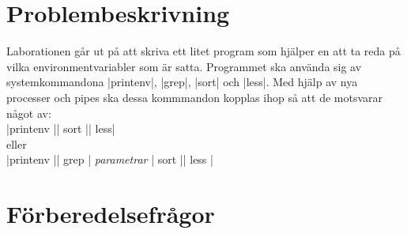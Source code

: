 \documentclass[paper=a4, fontsize=11pt]{scrartcl} %
\numberwithin{equation}{section} %
\numberwithin{figure}{section} %
\numberwithin{table}{section} %
\begin{document}
\section{Problembeskrivning}
Laborationen går ut på att skriva ett litet program som hjälper en att ta reda
på vilka environmentvariabler som är satta.
Programmet ska använda sig av systemkommandona |printenv|, |grep|, |sort|
och |less|.
Med hjälp av nya processer och pipes ska dessa kommmandon kopplas ihop
så att de motsvarar något av:
\\
|printenv |\textbar| sort |\textbar| less| \\ eller \\
|printenv |\textbar| grep | \emph{parametrar} | sort |\textbar| less | \\


\section{Förberedelsefrågor}
\end{document}
